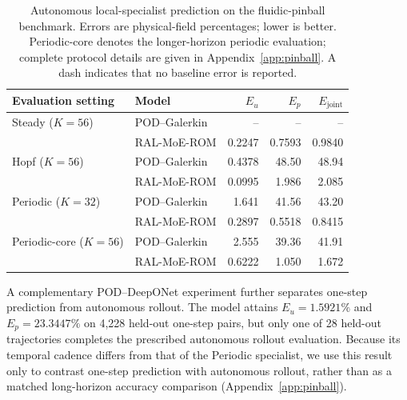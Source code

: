 \par
\begin{table}[H]
\centering
\caption{
Autonomous local-specialist prediction on the fluidic-pinball benchmark. Errors are physical-field percentages; lower is better. Periodic-core denotes the longer-horizon periodic evaluation; complete protocol details are given in Appendix~\ref{app:pinball}. A dash indicates that no baseline error is reported.
}
\label{tab:pinball_autonomous}
\small
\setlength{\tabcolsep}{5pt}
\begin{tabular}{@{}llrrr@{}}
\toprule
Evaluation setting & Model & $E_u$ & $E_p$ & $E_{\mathrm{joint}}$ \\
\midrule
Steady ($K=56$)
& POD--Galerkin
& -- & -- & -- \\
& RAL-MoE-ROM
& 0.2247 & 0.7593 & 0.9840 \\
\addlinespace

Hopf ($K=56$)
& POD--Galerkin
& 0.4378 & 48.50 & 48.94 \\
& RAL-MoE-ROM
& 0.0995 & 1.986 & 2.085 \\
\addlinespace

Periodic ($K=32$)
& POD--Galerkin
& 1.641 & 41.56 & 43.20 \\
& RAL-MoE-ROM
& 0.2897 & 0.5518 & 0.8415 \\
\addlinespace

Periodic-core ($K=56$)
& POD--Galerkin
& 2.555 & 39.36 & 41.91 \\
& RAL-MoE-ROM
& 0.6222 & 1.050 & 1.672 \\
\bottomrule
\end{tabular}
\end{table}
\par

A complementary POD--DeepONet experiment further separates one-step prediction from autonomous rollout.
The model attains $E_u=1.5921\%$ and $E_p=23.3447\%$ on 4,228 held-out one-step pairs, but only one of 28 held-out trajectories completes the prescribed autonomous rollout evaluation. Because its temporal cadence differs from that of the Periodic specialist, we use this result only to contrast one-step prediction with autonomous rollout, rather than as a matched long-horizon accuracy comparison (Appendix~\ref{app:pinball}).





